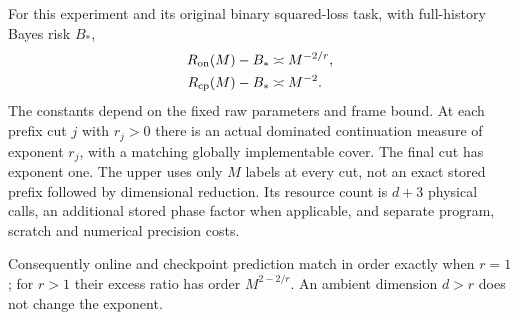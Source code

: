 \begin{theorem}\label{thm:ranknoisy}
For this experiment and its original binary squared-loss task, with full-history Bayes risk $B_*$,
\begin{align}
 R_{\mathrm{on}}(M)-B_*&\asymp M^{-2/r},\label{eq:rankonline}\\
 R_{\mathrm{cp}}(M)-B_*&\asymp M^{-2}.\label{eq:rankcheckpoint}
\end{align}
The constants depend on the fixed raw parameters and frame bound. At each prefix cut $j$ with $r_j>0$ there is an actual dominated continuation measure of exponent $r_j$, with a matching globally implementable cover. The final cut has exponent one. The upper uses only $M$ labels at every cut, not an exact stored prefix followed by dimensional reduction. Its resource count is $d+3$ physical calls, an additional stored phase factor when applicable, and separate program, scratch and numerical precision costs.

Consequently online and checkpoint prediction match in order exactly when $r=1$; for $r>1$ their excess ratio has order $M^{2-2/r}$. An ambient dimension $d>r$ does not change the exponent.
\end{theorem}
